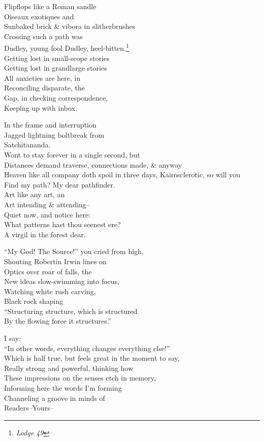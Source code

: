 \secdiv

Flipflops like a Roman sandle \\
Oiseaux exotiques and \\
Sunbaked brick \& vibora in slitherbrushes \\
Crossing such a path was \\
Dudley, young fool Dudley, heel-bitten.\footnote{\textit{Lodge 49}} \\

Getting lost in small-scope stories \\
Getting lost in grandlarge stories \\
All anxieties are here, in \\
Reconciling disparate, the \\ 
Gap, in checking correspondence, \\
Keeping up with inbox.

In the frame and interruption \\
Jagged lightning boltbreak from \\
Satchitananda. \\
Wont to stay forever in a single second, but \\
Distances demand traverse, connections made, \& anyway \\
Heaven like all company doth spoil in three days,
Kairosclerotic, so will you \\
Find my path? My dear pathfinder. \\
Art like any art, an \\
Art intending \& attending-- \\
Quiet now, and notice here: \\
What patterns hast thou seenest ere? \\
A virgil in the forest dear.

\secdiv

``My God! The Source!'' you cried from high, \\
Shouting Robertin Irwin lines on \\
Optics over roar of falls, the \\
New ideas slow-swimming into focus, \\
Watching white rush carving, \\
Black rock shaping \\
``Structuring structure, which is structured \\
By the flowing force it structures.''

I say: \\
``In other words, everything changes everything else!'' \\
Which is half true, but feels great in the moment to say, \\
Really strong and powerful, thinking how \\
These impressions on the senses etch in memory, \\
Informing here the words I'm forming \\
Channeling a groove in minds of \\
Readers--Yours--

